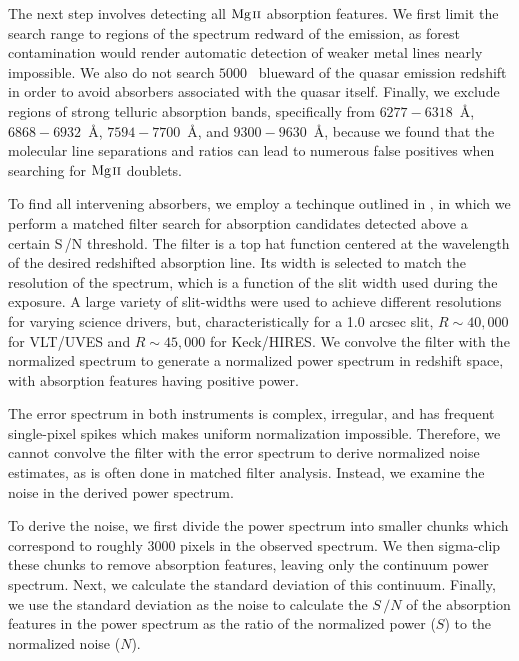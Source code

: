 \documentclass[iop,apj,numberedappendix,appendixfloats,twocolappendix]{emulateapj}
\begin{document}
The next step involves detecting all ${\hbox{{\rm Mg}\kern 0.1em{\sc ii}}}$ absorption features. We first limit the search range to regions of the spectrum redward of the {\Lya} emission, as {\Lya} forest contamination would render automatic detection of weaker metal lines nearly impossible. We also do not search $5000$~{\kms} blueward of the quasar emission redshift in order to avoid absorbers associated with the quasar itself. Finally, we exclude regions of strong telluric absorption bands, specifically from $6277 - 6318$~{\AA}, $6868 - 6932$~{\AA}, $7594 - 7700$~{\AA}, and $9300 - 9630$~{\AA}, because we found that the molecular line separations and ratios can lead to numerous false positives when searching for ${\hbox{{\rm Mg}\kern 0.1em{\sc ii}}}$ doublets.

To find all intervening {\MgIIdblt} absorbers, we employ a techinque outlined in \cite{Zhu2013}, in which we perform a matched filter search for absorption candidates detected above a certain S\,/N threshold. The filter is a top hat function centered at the wavelength of the desired redshifted absorption line. Its width is selected to match the resolution of the spectrum, which is a function of the slit width used during the exposure. A large variety of slit-widths were used to achieve different resolutions for varying science drivers, but, characteristically for a 1.0 arcsec slit, $R \sim 40,000$ for VLT/UVES and $R \sim 45,000$ for Keck/HIRES. We convolve the filter with the normalized spectrum to generate a normalized power spectrum in redshift space, with absorption features having positive power.

The error spectrum in both instruments is complex, irregular, and has frequent single-pixel spikes which makes uniform normalization impossible. Therefore, we cannot convolve the filter with the error spectrum to derive normalized noise estimates, as is often done in matched filter analysis. Instead, we examine the noise in the derived power spectrum.

To derive the noise, we first divide the power spectrum into smaller chunks which correspond to roughly 3000 pixels in the observed spectrum. We then sigma-clip these chunks to remove absorption features, leaving only the continuum power spectrum. Next, we calculate the standard deviation of this continuum. Finally, we use the standard deviation as the noise to calculate the $S\,/N$ of the absorption features in the power spectrum as the ratio of the normalized power ($S$) to the normalized noise ($N$).
\end{document}
